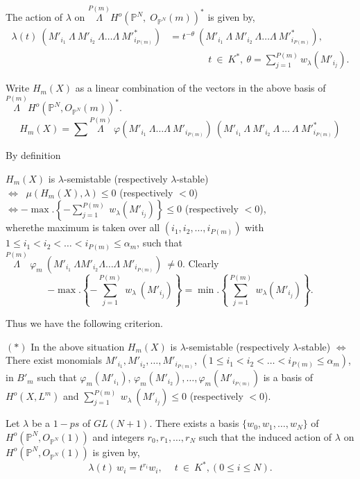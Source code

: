 {\noindent
The action of $\lambda$ on $\overset{P(m)}{\Lambda}
H^o(\mathbb{P}^N, \; O_{\mathbb{P}^N}(m))^*$ is given by, 
\begin{align*}
\lambda(t) ~(M'_{i_1}~\Lambda~M'_{i_2}~\Lambda \ldots
\Lambda~{M'}^*_{i_{P(m)}}) & =
t^{-\theta}~(M'_{i_1}~\Lambda~M'_{i_2}~\Lambda \ldots
\Lambda~ {M'}^*_{i_{P(m)}}), \\
&\qquad \qquad t ~\in~ K^*, ~\theta = \sum_{j=1}^{P(m)} w_\lambda
(M'_{i_j}).  
\end{align*}

Write $H_m(X)$ as a linear combination of the vectors in the above
basis of $\overset{P(m)}{\Lambda}
H^o(\mathbb{P}^N,O_{\mathbb{P}^{N}}(m))^*$. 
$$
H_m(X) = \sum\overset{P(m)}{\Lambda}~\varphi(M'_{i_1} ~\Lambda \ldots
\Lambda ~M'_{i_{P(m)}})~(M'_{i_1}~\Lambda~M'_{i_2}~ \Lambda
~\ldots~\Lambda ~M'^*_{i_{P(m)}}) 
$$

\noindent
By definition

\noindent
$H_m(X)$  is $\lambda$-semistable (respectively $\lambda$-stable)\\ 
$\Longleftrightarrow \;\; \mu(H_m(X),\lambda) \le 0$ (respectively
   $< 0$)\\ 
$\Longleftrightarrow - \max.\left\{ - \sum_{j=1}^{P(m)}~w_\lambda
  (M'_{i_j})\right\} \le 0$ (respectively $< 0$), \\ 
where\pageoriginale the maximum is taken over all
$(i_1,i_2,\ldots,i_{P(m)})$ with 
$1 \le i_1 < i_2 < \ldots < i_{P(m)} \le \alpha_m$, such that
$\overset{P(m)}{\Lambda}~\varphi_m ~ (M'_{i_1}~\Lambda
M'_{i_2}\Lambda\ldots \Lambda 
~ M'_{i_{P(m)}})~\neq 0$. Clearly  
$$
- \max.\left\{ - \sum_{j=1}^{P(m)}~w_\lambda~(M'_{i_j}) \right\} =
\min.\left\{ \sum_{j=1}^{P(m)}~w_\lambda (M'_{i_j})\right\}. 
$$

\noindent
Thus we have the following criterion.

\label{c0:*}
\medskip
$(*)$ In the above situation $H_m(X)$ is $\lambda$-semistable 
(respectively $\lambda$-stable) $\Longleftrightarrow$ There exist
monomials $M'_{i_1}, M'_{i_2}, \ldots, M'_{i_{P(m)}}$, $(1 \le i_1 < i_2
< \ldots < i_{P(m)} \le \alpha_m)$, in $B'_m$ such that
$\varphi_m(M'_{i_1})$,
$\varphi_m(M'_{i_2}),\ldots,\varphi_m(M'_{i_{P(m)}})$ is a basis of
$H^o(X,L^m)$ and $\sum\limits_{j=1}^{P(m)}~w_\lambda~(M'_{i_j}) \le 0$
(respectively $< 0$). 

Let $\lambda$ be a $1-ps$ of $GL(N+1)$. There exists a basis
$\{w_0, w_1, \ldots, w_N\}$ of $H^o(\mathbb{P}^N, O_{\mathbb{P}^N}(1))$
and integers $r_0, r_1, \ldots, r_N$ such that the induced action of
$\lambda$ on $H^o(\mathbb{P}^N, O_{\mathbb{P}^{N}}(1))$ is given by, 
$$
\lambda(t) ~w_i = t^{r_i}w_i, \quad ~t ~\in~K^*, (0 \le i \le N).
$$

}
